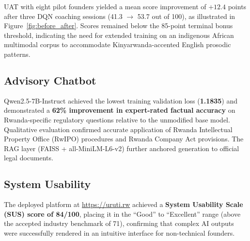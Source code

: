 \documentclass{article}
\begin{document}
\begin{table}[htbp]
\centering
\caption{RL algorithm comparison (500k timesteps, PitchEnv-v1, 8-env parallelism).}
\label{tab:rl_results}
\end{table}

UAT with eight pilot founders yielded a mean score improvement of
$+12.4$ points after three DQN coaching sessions (41.3 $\to$ 53.7 out of 100),
as illustrated in Figure~\ref{fig:before_after}.
Scores remained below the 85-point terminal bonus threshold, indicating
the need for extended training on an indigenous African multimodal corpus
to accommodate Kinyarwanda-accented English prosodic patterns.

\FloatBarrier
\subsection{Advisory Chatbot}

Qwen2.5-7B-Instruct achieved the lowest training validation loss (\textbf{1.1835})
and demonstrated a \textbf{62\% improvement in expert-rated factual accuracy}
on Rwanda-specific regulatory questions relative to the unmodified base model.
Qualitative evaluation confirmed accurate application of Rwanda Intellectual
Property Office (RwIPO) procedures and Rwanda Company Act provisions.
The RAG layer (FAISS + all-MiniLM-L6-v2) further anchored generation to
official legal documents.

\FloatBarrier
\subsection{System Usability}

The deployed platform at \url{https://uruti.rw} achieved a
\textbf{System Usability Scale (SUS) score of 84/100}, placing it in the
``Good'' to ``Excellent'' range (above the accepted industry benchmark of 71),
confirming that complex AI outputs were successfully rendered in an intuitive
interface for non-technical founders.
\end{document}

